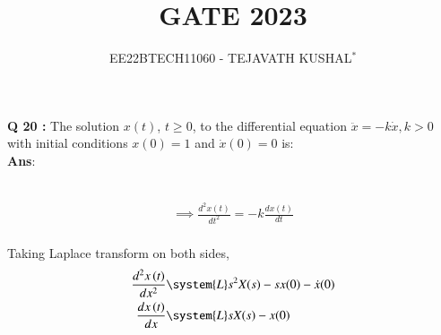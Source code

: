 \documentclass[journal,12pt,twocolumn]{IEEEtran}
\theoremstyle{remark}
\begin{document}

\vspace{3cm}

\title{GATE 2023}
\author{EE22BTECH11060 - TEJAVATH KUSHAL$^{*}$%
}
\maketitle
\newpage
\bigskip

\renewcommand{\thefigure}{\theenumi}
\renewcommand{\thetable}{\theenumi}

\maketitle
\noindent \textbf{Q 20 :} The solution \(x(t)\), \(t \geq 0\), to the differential equation
$\ddot{x} = -k\dot{x} , k > 0$
with initial conditions \(x(0) = 1\) and \(\dot{x} (0) = 0\) is: \quad {} \\

\noindent \textbf{Ans}:\\ \\
\begin{table}[h]

\end{table}
\begin{align}
    \implies \frac{d^2 x(t)}{dt^2} = -k\frac{dx(t)}{dt}
\end{align}\\

Taking Laplace transform on both sides,\\
\begin{align}
\label{eq:gate2023.in.20.2}\frac{d^2x\brak{t}}{dx^2} &\system{L} s^2X(s)-sx(0)-\dot{x}(0)\\
\label{eq:gate2023.in.20.3}\frac{dx\brak{t}}{dx} &\system{L} sX(s)-x(0)
\end{align}
\end{document}
